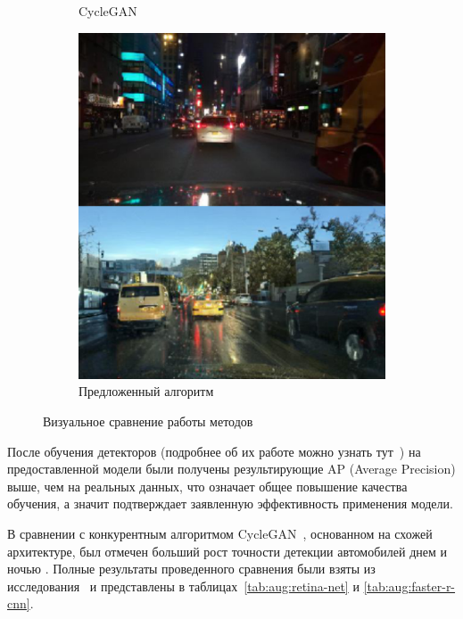 \documentclass[11pt,a4paper]{extarticle}
\begin{document}
{\begin{figure}[ht]
\begin{subfigure}[ht]{0.32\textwidth}
					\caption{CycleGAN~\cite{CycleGAN}}
				\end{subfigure}
				\begin{subfigure}[ht]{0.32\textwidth}
					\includegraphics[width=\textwidth]{img/aug_model}
					\caption{Предложенный алгоритм}
				\end{subfigure}
				\caption{Визуальное сравнение работы методов}
				\label{pic:aug_results}
			\end{figure}

			\noindent
			После обучения детекторов (подробнее об их работе можно узнать тут~\cite{disser_aug}) на предоставленной модели были получены результирующие AP (Average Precision) выше, чем на реальных данных, что означает общее повышение качества обучения, а значит подтверждает заявленную эффективность применения модели.
			
			В сравнении с конкурентным алгоритмом CycleGAN~\cite{CycleGAN}, основанном на схожей архитектуре, был отмечен больший рост точности детекции автомобилей днем \cite[RetinaNet]{detector:retina-net} и ночью \cite[Faster R-CNN]{detector:faster-r-cnn}.
			Полные результаты проведенного сравнения были взяты из исследования~\cite{disser_aug} и представлены в таблицах~\ref{tab:aug:retina-net} и \ref{tab:aug:faster-r-cnn}.

}
\end{document}
